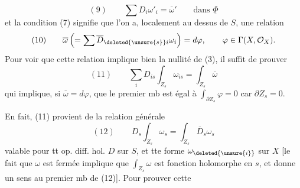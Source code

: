 \[
(9)\qquad \sum D_i\omega'_i=\overline\omega'\qquad\text{dans }\underline\Phi
\]
et la condition (7) signifie que l'on a, localement au dessus de $S$, une relation
\[
(10)\qquad \overline\omega\left(=\sum\overline D_{\deleted{\unsure{s}}i}\omega_i\right)=d\varphi,\qquad \varphi\in\Gamma(X,\mathcal O_X).
\]
Pour voir que cette relation implique bien la nullité de (3), il suffit de prouver
\[
(11)\qquad \sum_i D_{is}\int_{Z_s}\omega_{is}=\int_{Z_s}\overline\omega
\]
qui implique, si $\overline\omega=d\varphi$, que le premier mb est égal à $\int_{\partial Z_s}\varphi=0$ car $\partial Z_s=0$.

En fait, (11) provient de la relation générale
\[
(12)\qquad D_s\int_{Z_s}\omega_s=\int_{Z_s}\overline D_s\omega_s
\]
valable pour tt op. diff. hol. $D$ sur $S$, et tte forme  $\omega_{\deleted{\unsure{i}}}$ sur $X$ [le fait que $\omega$ est fermée implique que $\int_{Z_s}\omega$ est fonction holomorphe en $s$, et donne un sens au premier mb de (12)]. Pour prouver cette
